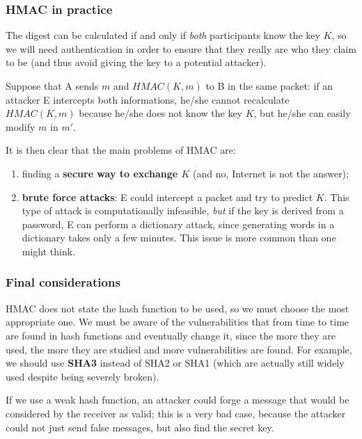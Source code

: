 
\subsubsection{HMAC in practice}
The digest can be calculated if and only if \textit{both} participants know the key $K$, so we will need authentication in order to ensure that they really are who they claim to be (and thus avoid giving the key to a potential attacker).

Suppose that A sends $m$ and $\mathit{HMAC}(K, m)$ to B in the same packet: if an attacker E intercepts both informations, he/she cannot recalculate $\mathit{HMAC}(K, m)$ because he/she does not know the key $K$, but he/she can easily modify $m$ in $m'$.

It is then clear that the main problems of HMAC are:

\begin{enumerate}
    \item finding a \textbf{secure way to exchange $K$} (and no, Internet is not the answer);
    \item \textbf{brute force attacks}: E could intercept a packet and try to predict $K$. This type of
attack is computationally infeasible, \textit{but} if the key is derived from a password, E can perform a dictionary
attack, since generating words in a dictionary takes only a few minutes. This issue is more common than one might think.
\end{enumerate}


\subsubsection{Final considerations}
HMAC does not state the hash function to be used, so we must choose the most appropriate one. We must be aware of the vulnerabilities that from time to time are found in hash functions and eventually change it, since the more they are used, the more they are studied and more vulnerabilities are found. For example, we should use \textbf{SHA3} instead of SHA2 or SHA1 (which are actually still widely used despite being severely broken).

If we use a weak hash function, an attacker could forge a message that would be considered by the receiver as valid; this is a very bad case, because the attacker could not just send false messages, but also find the secret key.

